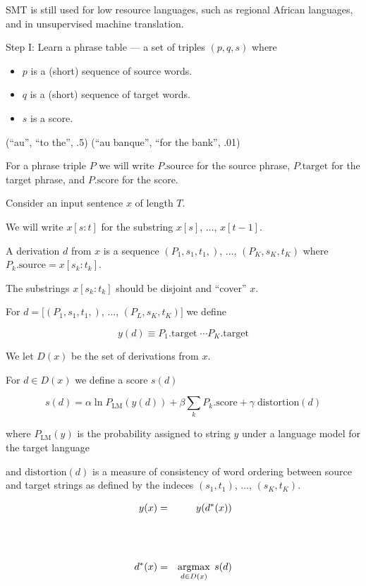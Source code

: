 {\vfill
SMT is still used for low resource languages, such as regional African languages, and in unsupervised machine translation.



Step I:   Learn a phrase table --- a set of triples $(p,q,s)$ where

\vfill
\begin{itemize}
\item $p$ is a (short) sequence of source words.
  \vfill
\item $q$ is a (short) sequence of target words.
  \vfill
\item $s$ is a score.
\end{itemize}

\vfill
(``au'', ``to the'', .5) \hfill (``au banque'', ``for the bank'', .01)

\vfill
For a phrase triple $P$ we will write $P.\mathrm{source}$ for the source phrase, $P.\mathrm{target}$ for the target phrase, and $P.\mathrm{score}$ for the score.


Consider an input sentence $x$ of length $T$.

\vfill
We will write $x[s:t]$ for the substring $x[s]$, $\ldots$, $x[t-1]$.

\vfill
A derivation $d$ from $x$ is a sequence $(P_1,s_1,t_1,)$, $\ldots$, $(P_K,s_K,t_K)$ where $P_k.\mathrm{source} = x[s_k:t_k]$.

\vfill
The substrings $x[s_k:t_k]$ should be disjoint and ``cover'' $x$.

\vfill
For $d = [(P_1,s_1,t_1,)$, $\ldots$, $(P_L,s_K,t_K)]$ we define

$$ y(d) \equiv P_1.\mathrm{target}\;\cdots P_K.\mathrm{target}$$

\vfill
We let $D(x)$ be the set of derivations from $x$.


For $d \in D(x)$ we define a score $s(d)$

\vfill
$$s(d) = \alpha \ln P_\mathrm{LM}(y(d)) + \beta \sum_k P_k.\mathrm{score} + \gamma \;\mathrm{distortion}(d)$$

\vfill
where $P_{\mathrm{LM}}(y)$ is the probability assigned to string $y$ under a language model for the target language

\vfill
and $\mathrm{distortion}(d)$ is a measure of consistency of word ordering between source and target strings as defined by
the indeces $(s_1,t_1)$, $\ldots$, $(s_K,t_K)$.


\begin{eqnarray*}
  y(x) & = & y(d^*(x)) \\
  \\
  \\
  \\
  d^*(x) & = & \operatorname*{argmax}_{d \in D(x)} \;s(d)
\end{eqnarray*}

}

